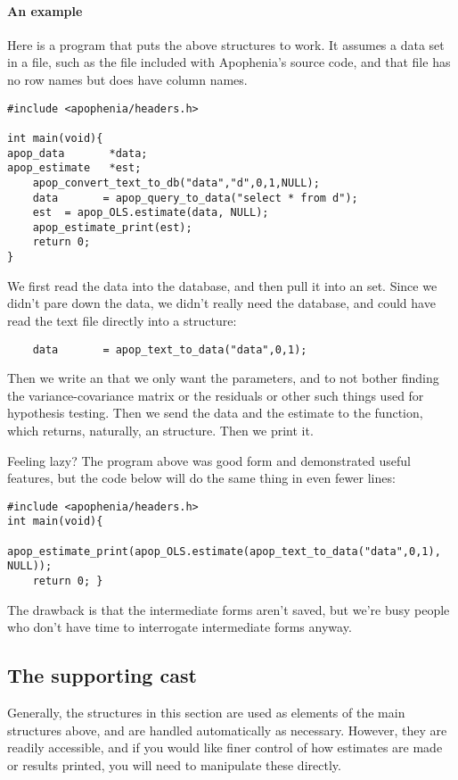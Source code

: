 \paragraph{An example}
Here is a program that puts the above structures to work.  It assumes a
data set in a file, such as the  file included with
Apophenia's source code, and that file has no row names but does have
column names.
\begin{lstlisting}
#include <apophenia/headers.h>

int main(void){
apop_data       *data;
apop_estimate   *est;
    apop_convert_text_to_db("data","d",0,1,NULL);
    data       = apop_query_to_data("select * from d");
    est  = apop_OLS.estimate(data, NULL);
    apop_estimate_print(est);
    return 0;
}
\end{lstlisting}

We first read the data into the database, and then pull it into an  set. Since we didn't pare down the data, we didn't really
need the database, and could have read the text file directly into a
 structure:
\begin{lstlisting}
    data       = apop_text_to_data("data",0,1);
\end{lstlisting}
Then we write an  that we only want the
parameters, and to not bother finding the variance-covariance matrix or
the residuals or other such things used for hypothesis testing. Then we
send the data and the estimate to the 
function, which returns, naturally, an 
structure. Then we print it.

Feeling lazy? The program above was good form and demonstrated useful
features, but the code below will do the same thing in even fewer lines:

\label{oneliner}
\begin{lstlisting}
#include <apophenia/headers.h>
int main(void){
    apop_estimate_print(apop_OLS.estimate(apop_text_to_data("data",0,1), NULL));
    return 0; }
\end{lstlisting}

The drawback is that the intermediate forms aren't saved, but we're busy
people who don't have time to interrogate intermediate forms anyway.

\subsection{\treesymbol{} The supporting cast}
Generally, the structures in this section are used as elements of the main
structures above, and are handled automatically as necessary. However,
they are readily accessible, and if you would like finer control of how
estimates are made or results printed, you will need to manipulate these
directly.

